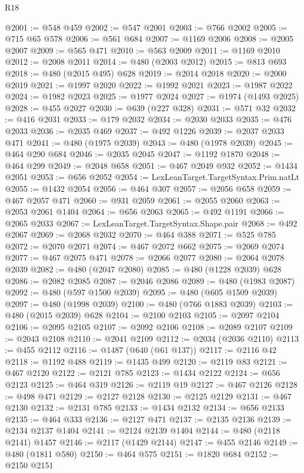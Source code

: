 \begin{lexlean}{R18}
\begin{coremodule}
{{{{{{{{{{{{{{{{{{{{{{{{{{{{{{{{{{{{{{{{{{{{{{{{{{{{{{{{{{{{{{{{{{{{{{{{{{{{{{{{{{{{{{{{{{{{{{{{{{{{{{{{{{{{{@2001 := @548 @459
@2002 := @547 @2001
@2003 := @766 @2002
@2005 := @715 @65 @578
@2006 := @561 @684
@2007 := @1169 @2006
@2008 := @2005 @2007
@2009 := @565 @471
@2010 := @563 @2009
@2011 := @1169 @2010
@2012 := @2008 @2011
@2014 := @480 (@2003 @2012)
@2015 := @813 @693
@2018 := @480 (@2015 @495) @628
@2019 := @2014 @2018
@2020 := @2000 @2019
@2021 := @1997 @2020
@2022 := @1992 @2021
@2023 := @1987 @2022
@2024 := @1982 @2023
@2025 := @1977 @2024
@2027 := @1974 (@1493 @2025)
@2028 := @455 @2027
@2030 := @639 (@227 @328)
@2031 := @571 @32
@2032 := @416 @2031
@2033 := @179 @2032
@2034 := @2030 @2033
@2035 := @476 @2033
@2036 := @2035 @469
@2037 := @492 @1226
@2039 := @2037 @2033 @471
@2041 := @480 (@1975 @2039)
@2043 := @480 (@1978 @2039)
@2045 := @464 @290 @684
@2046 := @2035 @2045
@2047 := @1192 @1870
@2048 := @464 @299
@2049 := @2048 @658
@2051 := @467 @2049 @932
@2052 := @1434 @2051
@2053 := @656 @2052
@2054 := LexLeanTarget.TargetSyntax.Prim.natLt
@2055 := @1432 @2054
@2056 := @464 @307
@2057 := @2056 @658
@2059 := @467 @2057 @471
@2060 := @931 @2059
@2061 := @2055 @2060
@2063 := @2053 @2061 @1404
@2064 := @656 @2063
@2065 := @492 @1191
@2066 := @2065 @2033
@2067 := LexLeanTarget.TargetSyntax.Shape.pair
@2068 := @492 @2067
@2069 := @2068 @2032
@2070 := @464 @388
@2071 := @525 @785
@2072 := @2070 @2071
@2074 := @467 @2072 @662
@2075 := @2069 @2074
@2077 := @467 @2075 @471
@2078 := @2066 @2077
@2080 := @2064 @2078 @2039
@2082 := @480 (@2047 @2080)
@2085 := @480 (@1228 @2039) @628
@2086 := @2082 @2085
@2087 := @2046 @2086
@2089 := @480 (@1983 @2087)
@2092 := @480 (@597 @1500 @2039)
@2095 := @480 (@605 @1509 @2039)
@2097 := @480 (@1998 @2039)
@2100 := @480 (@766 @1883 @2039)
@2103 := @480 (@2015 @2039) @628
@2104 := @2100 @2103
@2105 := @2097 @2104
@2106 := @2095 @2105
@2107 := @2092 @2106
@2108 := @2089 @2107
@2109 := @2043 @2108
@2110 := @2041 @2109
@2112 := @2034 (@2036 @2110)
@2113 := @455 @2112
@2116 := @1487 (@640 (@61 @137))
@2117 := @2116 @42
@2118 := @1192 @488
@2119 := @1435 @499
@2120 := @2119 @83
@2121 := @467 @2120
@2122 := @2121 @785
@2123 := @1434 @2122
@2124 := @656 @2123
@2125 := @464 @319
@2126 := @2119 @19
@2127 := @467 @2126
@2128 := @498 @471
@2129 := @2127 @2128
@2130 := @2125 @2129
@2131 := @467 @2130
@2132 := @2131 @785
@2133 := @1434 @2132
@2134 := @656 @2133
@2135 := @464 @333
@2136 := @2127 @471
@2137 := @2135 @2136
@2139 := @2134 @2137 @1404
@2141 := @2124 @2139 @1404
@2144 := @480 (@2118 @2141) @1457
@2146 := @2117 (@1429 @2144)
@2147 := @455 @2146
@2149 := @480 (@1811 @580)
@2150 := @464 @575
@2151 := @1820 @684
@2152 := @2150 @2151
}}}}}}}}}}}}}}}}}}}}}}}}}}}}}}}}}}}}}}}}}}}}}}}}}}}}}}}}}}}}}}}}}}}}}}}}}}}}}}}}}}}}}}}}}}}}}}}}}}}}}}}}}}}}}
\end{coremodule}
\end{lexlean}
